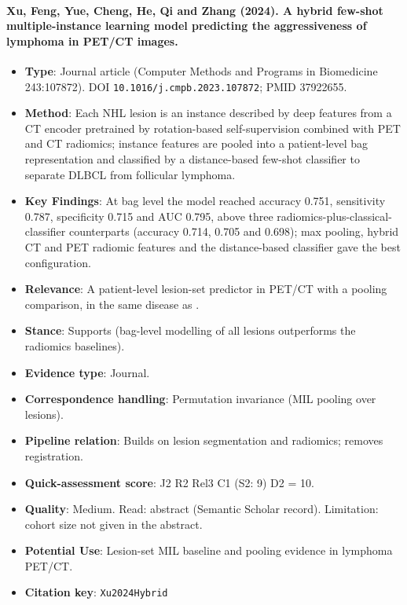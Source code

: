 \documentclass[journal,onecolumn]{IEEEtran}
\begin{document}
\paragraph{Xu, Feng, Yue, Cheng, He, Qi and Zhang (2024). A hybrid few-shot multiple-instance learning model predicting the aggressiveness of lymphoma in PET/CT images.~\cite{Xu2024Hybrid}}\mbox{}

\begin{itemize}

\item{} \textbf{Type}: Journal article (Computer Methods and Programs in Biomedicine 243:107872). DOI \nolinkurl{10.1016/j.cmpb.2023.107872}; PMID 37922655.

\item{} \textbf{Method}: Each NHL lesion is an instance described by deep features from a CT encoder pretrained by rotation-based self-supervision combined with PET and CT radiomics; instance features are pooled into a patient-level bag representation and classified by a distance-based few-shot classifier to separate DLBCL from follicular lymphoma.

\item{} \textbf{Key Findings}: At bag level the model reached accuracy 0.751, sensitivity 0.787, specificity 0.715 and AUC 0.795, above three radiomics-plus-classical-classifier counterparts (accuracy 0.714, 0.705 and 0.698); max pooling, hybrid CT and PET radiomic features and the distance-based classifier gave the best configuration.

\item{} \textbf{Relevance}: A patient-level lesion-set predictor in PET/CT with a pooling comparison, in the same disease as \cite{Karimzadeh2026Revisiting}.

\item{} \textbf{Stance}: Supports (bag-level modelling of all lesions outperforms the radiomics baselines).

\item{} \textbf{Evidence type}: Journal.

\item{} \textbf{Correspondence handling}: Permutation invariance (MIL pooling over lesions).

\item{} \textbf{Pipeline relation}: Builds on lesion segmentation and radiomics; removes registration.

\item{} \textbf{Quick-assessment score}: J2 R2 Rel3 C1 (S2: 9) D2 = 10.

\item{} \textbf{Quality}: Medium. Read: abstract (Semantic Scholar record). Limitation: cohort size not given in the abstract.

\item{} \textbf{Potential Use}: Lesion-set MIL baseline and pooling evidence in lymphoma PET/CT.

\item{} \textbf{Citation key}: \texttt{Xu2024Hybrid}

\end{itemize}
\end{document}
